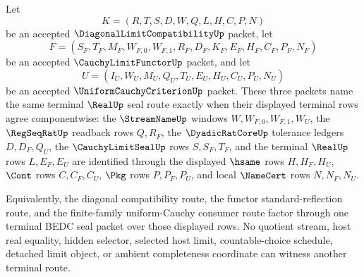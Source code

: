 \begin{theorem}
\label{thm:diagonal-limit-compatibility-functor-uniform-terminal-factorization}
Let
$$
K=(R,T,S,D,W,Q,L,H,C,P,N)
$$
be an accepted $\DiagonalLimitCompatibilityUp$ packet, let
$$
F=(S_F,T_F,M_F,W_{F,0},W_{F,1},R_F,D_F,K_F,E_F,H_F,C_F,P_F,N_F)
$$
be an accepted $\CauchyLimitFunctorUp$ packet, and let
$$
U=(I_U,W_U,M_U,Q_U,T_U,E_U,H_U,C_U,P_U,N_U)
$$
be an accepted $\UniformCauchyCriterionUp$ packet. These three packets name the same terminal $\RealUp$ seal route exactly when their displayed terminal rows agree componentwise: the $\StreamNameUp$ windows $W,W_{F,0},W_{F,1},W_U$, the $\RegSeqRatUp$ readback rows $Q,R_F$, the $\DyadicRatCoreUp$ tolerance ledgers $D,D_F,Q_U$, the $\CauchyLimitSealUp$ rows $S,S_F,T_F$, and the terminal $\RealUp$ rows $L,E_F,E_U$ are identified through the displayed $\hsame$ rows $H,H_F,H_U$, $\Cont$ rows $C,C_F,C_U$, $\Pkg$ rows $P,P_F,P_U$, and local $\NameCert$ rows $N,N_F,N_U$.

Equivalently, the diagonal compatibility route, the functor standard-reflection route, and the finite-family uniform-Cauchy consumer route factor through one terminal BEDC seal packet over those displayed rows. No quotient stream, host real equality, hidden selector, selected host limit, countable-choice schedule, detached limit object, or ambient completeness coordinate can witness another terminal route.
\end{theorem}
